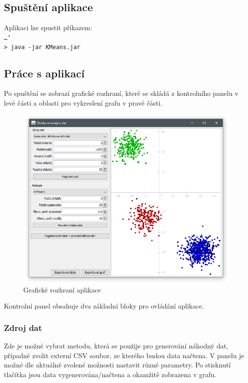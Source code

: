 \documentclass[pdftex,a4paper]{article}
\begin{document}
\subsection{Spuštění aplikace}
Aplikaci lze spustit příkazem:
\\[2mm]
\texttt{\ldots\char`\\ > java -jar KMeans.jar}


\subsection{Práce s aplikací}\label{subsec:prace-s-aplikace}
Po spuštění se zobrazí grafické rozhraní, které se skládá z kontrolního panelu v levé části a oblasti pro vykreslení grafu v pravé části.


\begin{figure}[h]
	\centering
	\includegraphics[width=1\textwidth]{res/gui.png}
	\caption{Grafické rozhraní aplikace}
	\label{fig:obr-gui}
\end{figure}


Kontrolní panel obsahuje dva základní bloky pro ovládání aplikace.

\subsubsection*{Zdroj dat}
Zde je možné vybrat metodu, která se použije pro generování náhodný dat, případně zvolit externí CSV soubor, ze kterého budou data načtena. V panelu je možné dle aktuálně zvolené možnosti nastavit různé parametry. Po stisknutí tlačítka jsou data vygenerována/načtena a okamžitě zobrazena v grafu.
\end{document}
